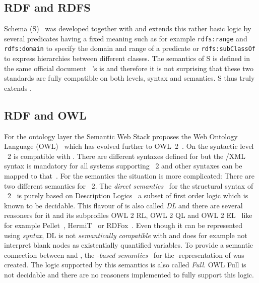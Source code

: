 \subsection{RDF and RDFS}
\rdf Schema (\rdf{}S)~\cite{RDFS} was developed together with \rdf and extends this rather basic logic by several predicates having a fixed meaning such as for example 
\texttt{rdfs:range} and \texttt{rdfs:domain} to specify the domain and range of a predicate or \texttt{rdfs:subClassOf} to express hierarchies between different classes.
The semantics of \rdf{}S is defined in the same official document~\cite{RDFSemantics} \rdf's is and therefore it is not surprising that these two standards are fully compatible
on both levels, syntax and semantics. 
\rdf{}S thus truly extends \rdf. 

\subsection{RDF and OWL}\label{rdfandowl}
For the ontology layer the Semantic Web Stack proposes the Web Ontology Language (OWL)~\cite{owlold} which has evolved further to \linebreak OWL~2~\cite{owl}. 
On the syntactic level \owl~2 is compatible with \rdf. There are different syntaxes defined for \owl but the \rdf{}/XML syntax is mandatory for all 
systems supporting \owl~2 and other 
syntaxes can be mapped to that~\cite{owltordf}.
For the semantics the situation is more complicated: There are two different semantics for \owl~2. 
The \emph{direct semantics}~\cite{owldsem} for the structural syntax of \owl~2~\cite{owlsyn1} is purely based on Description Logics~\cite{dl} a subset of first order logic
which is known 
to be decidable.
This flavour of  is also called \emph{\owl DL} and there are several reasoners for it and its subprofiles OWL 2 RL, OWL 2 QL and OWL 2 EL~\cite{OWLRL}
like for example Pellet~\cite{Pellet}, HermiT~\cite{hermit} or RDFox~\cite{rdfox}.  
Even though it can be represented using \rdf \emph{syntax}, \owl DL is not \emph{semantically compatible} with \rdf and 
does for example not interpret blank nodes as existentially quantified variables.
To provide a semantic connection between \owl and \rdf, 
the \emph{\rdf-based semantics}~\cite{owlrdfsem} for the \rdf-representation of  was created. %
The logic supported by this semantics is also called \emph{\owl Full}. OWL Full is not decidable and there are no reasoners implemented to fully support 
this logic. 


